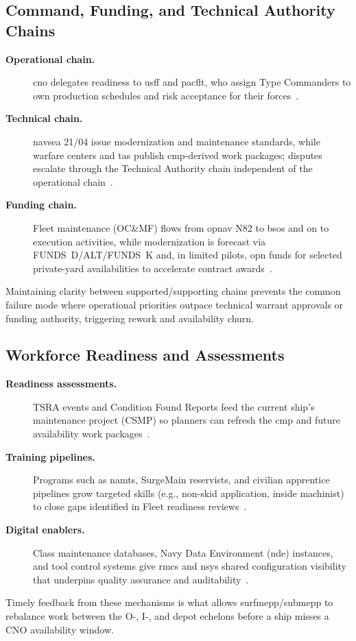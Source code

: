 \documentclass[../main.tex]{subfiles}
\begin{document}
\subsection{Command, Funding, and Technical Authority Chains}
\begin{description}
\item[\textbf{Operational chain.}] \ac{cno} delegates readiness to \ac{usff} and \ac{pacflt}, who assign Type Commanders to own production schedules and risk acceptance for their forces~\autocite{OPNAVINST4700-7M}.
\item[\textbf{Technical chain.}] \ac{navsea} 21/04 issue modernization and maintenance standards, while warfare centers and \acp{ta} publish \ac{cmp}-derived work packages; disputes escalate through the Technical Authority chain independent of the operational chain~\autocite{OPNAVINST4700-7M,NAVSEAINST5450-145A}.
\item[\textbf{Funding chain.}] Fleet maintenance (OC\&MF) flows from \ac{opnav} N82 to \ac{bso}s and on to execution activities, while modernization is forecast via FUNDS~D/ALT/FUNDS~K and, in limited pilots, \ac{opn} funds for selected private-yard availabilities to accelerate contract awards~\autocite{edo-4-1-1-fleet-maint-assets-2025,DoDFMR-Vol3}.
\end{description}
Maintaining clarity between supported/supporting chains prevents the common failure mode where operational priorities outpace technical warrant approvals or funding authority, triggering rework and availability churn.

\subsection{Workforce Readiness and Assessments}
\begin{description}
\item[\textbf{Readiness assessments.}] TSRA events and Condition Found Reports feed the current ship's maintenance project (CSMP) so planners can refresh the \ac{cmp} and future availability work packages~\autocite{edo-4-1-1-fleet-maint-assets-2025}.
\item[\textbf{Training pipelines.}] Programs such as \ac{namts}, SurgeMain reservists, and civilian apprentice pipelines grow targeted skills (e.g., non-skid application, inside machinist) to close gaps identified in Fleet readiness reviews~\autocite{edo-4-1-1-fleet-maint-assets-2025}.
\item[\textbf{Digital enablers.}] Class maintenance databases, Navy Data Environment (\ac{nde}) instances, and tool control systems give \ac{rmc}s and \acp{nsy} shared configuration visibility that underpins quality assurance and auditability~\autocite{NAVSEAINST5450-145A}.
\end{description}
Timely feedback from these mechanisms is what allows \ac{surfmepp}/\ac{submepp} to rebalance work between the O-, I-, and depot echelons before a ship misses a CNO availability window.
\end{document}
